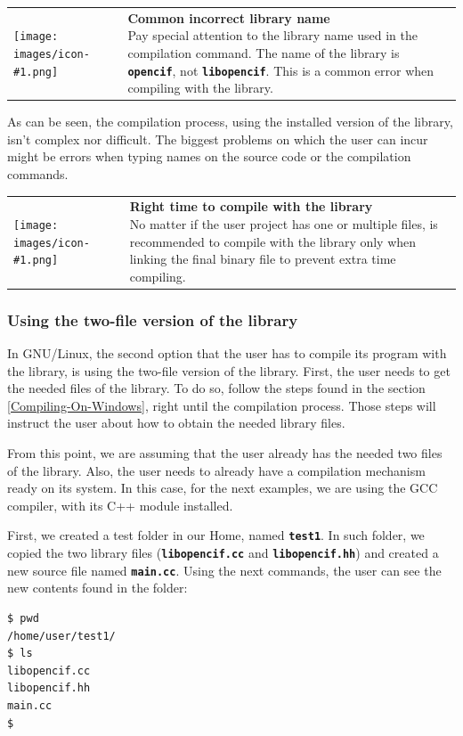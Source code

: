 \documentclass[11pt,twoside,openany,x11names,svgnames]{memoir}
\makeatletter
\newcommand{\IconNote}[3]
{
	\begin{table}[ht]
	\begin{tabular}{ lm{\dimexpr\textwidth-8\tabcolsep-\wd0}@{}}
		\toprule
		\texttt{[image: images/icon-\#1.png]}
		&
		\parbox[t]{155mm}{
		\textbf{#2} \\
		#3
		}
	\end{tabular}
\end{table}
}
\makeatother
\begin{document}
\IconNote
	{warning}
	{Common incorrect library name}
	{Pay special attention to the library name used in the compilation command. The name of the library is \textbf{\texttt{opencif}}, not \textbf{\texttt{libopencif}}. This is a common error when compiling with the library.}
	
As can be seen, the compilation process, using the installed version of the library, isn't complex nor difficult. The biggest problems on which the user can incur might be errors when typing names on the source code or the compilation commands.

\IconNote
	{info}
	{Right time to compile with the library}
	{No matter if the user project has one or multiple files, is recommended to compile with the library only when linking the final binary file to prevent extra time compiling.}
	
\subsubsection{Using the two-file version of the library}\label{Using-the-two-file-version-of-the-library}

In GNU/Linux, the second option that the user has to compile its program with the library, is using the two-file version of the library. First, the user needs to get the needed files of the library. To do so, follow the steps found in the section \ref{Compiling-On-Windows}, right until the compilation process. Those steps will instruct the user about how to obtain the needed library files.

From this point, we are assuming that the user already has the needed two files of the library. Also, the user needs to already have a compilation mechanism ready on its system. In this case, for the next examples, we are using the GCC compiler, with its C++ module installed.

First, we created a test folder in our Home, named \textbf{\texttt{test1}}. In such folder, we copied the two library files (\textbf{\texttt{libopencif.cc}} and \textbf{\texttt{libopencif.hh}}) and created a new source file named \textbf{\texttt{main.cc}}. Using the next commands, the user can see the new contents found in the folder:

\begin{lstlisting}[frame=single,style=SystemCommandStyle]
$ pwd
/home/user/test1/
$ ls
libopencif.cc
libopencif.hh
main.cc
$
\end{lstlisting}
\end{document}
